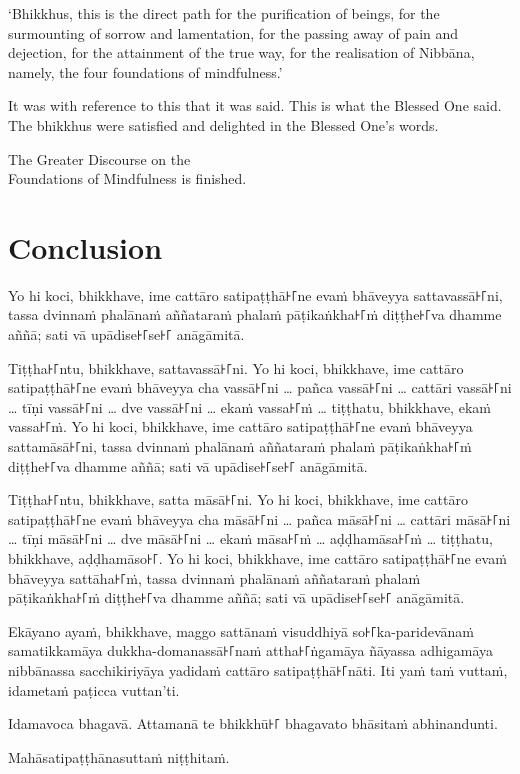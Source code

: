 `Bhikkhus, this is the direct path for the purification of beings, for the
surmounting of sorrow and lamentation, for the passing away of pain and
dejection, for the attainment of the true way, for the realisation of Nibbāna,
namely, the four foundations of mindfulness.'

It was with reference to this that it was said. This is what the Blessed One
said. The bhikkhus were satisfied and delighted in the Blessed One's words.

\bigskip

{\centering\instructionFont\color{instruction}\upshape

  The Greater Discourse on the\\
  Foundations of Mindfulness is finished.

}

\paliPage
\chapter*{Conclusion}

Yo hi koci, bhikkhave, ime cattāro satipaṭṭhā꜔꜒ne evaṁ bhāveyya sattavassā꜔꜒ni,
tassa dvinnaṁ phalānaṁ aññataraṁ phalaṁ pāṭikaṅkha꜔꜒ṁ diṭṭhe꜔꜒va dhamme aññā; sati
vā upādise꜔꜒se꜔꜒ anāgāmitā.

Tiṭṭha꜔꜒ntu, bhikkhave, sattavassā꜔꜒ni. Yo hi koci, bhikkhave, ime cattāro
satipaṭṭhā꜔꜒ne evaṁ bhāveyya cha vassā꜔꜒ni \ldots{} pañca vassā꜔꜒ni
\ldots{} cattāri vassā꜔꜒ni \ldots{} tīṇi vassā꜔꜒ni \ldots{} dve vassā꜔꜒ni \ldots{}
ekaṁ vassa꜔꜒ṁ \ldots{} tiṭṭhatu, bhikkhave, ekaṁ vassa꜔꜒ṁ. Yo hi koci, bhikkhave,
ime cattāro satipaṭṭhā꜔꜒ne evaṁ bhāveyya sattamāsā꜔꜒ni, tassa dvinnaṁ phalānaṁ
aññataraṁ phalaṁ pāṭikaṅkha꜔꜒ṁ diṭṭhe꜔꜒va dhamme aññā; sati vā upādise꜔꜒se꜔꜒ anāgāmitā.

Tiṭṭha꜔꜒ntu, bhikkhave, satta māsā꜔꜒ni. Yo hi koci, bhikkhave, ime cattāro
satipaṭṭhā꜔꜒ne evaṁ bhāveyya cha māsā꜔꜒ni \ldots{} pañca māsā꜔꜒ni \ldots{}
cattāri māsā꜔꜒ni \ldots{} tīṇi māsā꜔꜒ni \ldots{} dve māsā꜔꜒ni \ldots{} ekaṁ māsa꜔꜒ṁ
\ldots{} aḍḍhamāsa꜔꜒ṁ \ldots{} tiṭṭhatu, bhikkhave, aḍḍhamāso꜔꜒. Yo hi koci,
bhikkhave, ime cattāro satipaṭṭhā꜔꜒ne evaṁ bhāveyya sattāha꜔꜒ṁ, tassa dvinnaṁ
phalānaṁ aññataraṁ phalaṁ pāṭikaṅkha꜔꜒ṁ diṭṭhe꜔꜒va dhamme aññā; sati vā upādise꜔꜒se꜔꜒
anāgāmitā.

Ekāyano ayaṁ, bhikkhave, maggo sattānaṁ visuddhiyā so꜔꜒ka-paridevānaṁ samatikkamāya
dukkha-domanassā꜔꜒naṁ attha꜔꜒ṅgamāya ñāyassa adhigamāya nibbānassa sacchikiriyāya
yadidaṁ cattāro satipaṭṭhā꜔꜒nāti. Iti yaṁ taṁ vuttaṁ, idametaṁ paṭicca vuttan'ti.

Idamavoca bhagavā. Attamanā te bhikkhū꜔꜒ bhagavato bhāsitaṁ abhinandunti.

\bigskip

{\centering\instructionFont\color{instruction}\upshape

  Mahāsatipaṭṭhānasuttaṁ niṭṭhitaṁ.

}

\resumeNormalText
